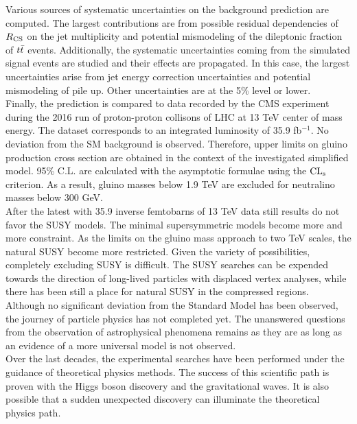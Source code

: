 Various sources of systematic uncertainties on the background prediction are computed. The largest contributions are from possible residual dependencies of $R_{\rm CS}$ on the jet multiplicity and potential mismodeling of the dileptonic fraction of $t\bar{t}$ events. Additionally, the systematic uncertainties coming from the simulated signal events are studied and their effects are propagated. In this case, the largest uncertainties arise from jet energy correction uncertainties and potential mismodeling of pile up. Other uncertainties are at the 5\% level or lower.\\
Finally, the prediction is compared to data recorded by the CMS experiment during the 2016 run of proton-proton collisons of LHC at 13 TeV center of mass energy. The dataset corresponds to an integrated luminosity of 35.9 fb$^{-1}$. No deviation from the SM background is observed. Therefore, upper limits on gluino production cross section are obtained in the context of the investigated simplified model. 95\% C.L. are calculated with the asymptotic formulae using the $\rm CL_s$ criterion. As a result, gluino masses below 1.9 TeV are excluded for neutralino masses below 300 GeV.\\
After the latest with 35.9 inverse femtobarns of 13 TeV data still results do not favor the SUSY models. The minimal supersymmetric models become more and more constraint. As the limits on the gluino mass approach to two TeV scales, the natural SUSY become more restricted. Given the variety of possibilities, completely excluding SUSY is difficult. The SUSY searches can be expended towards the direction of long-lived particles with displaced vertex analyses, while there has been still a place for natural SUSY in the compressed regions. \\
Although no significant deviation from the Standard Model has been observed, the journey of particle physics has not completed yet. The unanswered questions from the observation of astrophysical phenomena remains as they are as long as an evidence of a more universal model is not observed. \\
Over the last decades, the experimental searches have been performed under the guidance of theoretical physics methods. The success of this scientific path is proven with the Higgs boson discovery and the gravitational waves.
It is also possible that a sudden unexpected discovery can illuminate the theoretical physics path. 